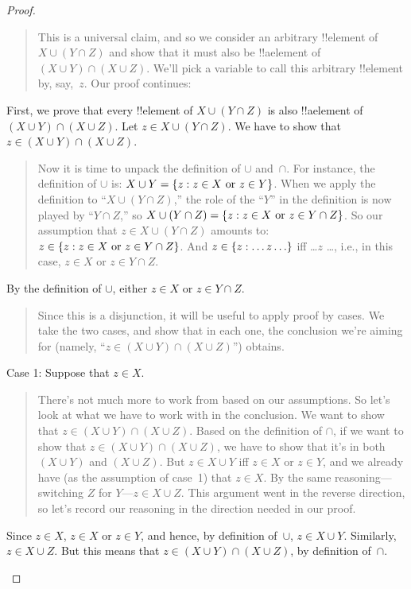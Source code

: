 \documentclass[../../../include/open-logic-section]{subfiles}
\begin{document}
\begin{proof}
\begin{quote}
This is a universal claim, and so we consider an arbitrary !!{element}
of $X \cup (Y \cap Z)$ and show that it must also be !!a{element} of
$(X \cup Y) \cap (X \cup Z)$. We'll pick a variable to call this
arbitrary !!{element} by, say,~$z$.  Our proof continues:
\end{quote}
First, we prove that every !!{element} of $X \cup (Y \cap Z)$ is also
!!a{element} of $(X \cup Y) \cap (X \cup Z)$. Let $z \in X \cup (Y
\cap Z)$. We have to show that $z \in (X \cup Y) \cap (X \cup Z)$.
\begin{quote}  
Now it is time to unpack the definition of $\cup$ and~$\cap$. For
instance, the definition of $\cup$ is: $X \cup Y = \{ z : z \in X
  \text{ or } z \in Y \}$.  When we apply the definition to ``$X \cup (Y
\cap Z)$,'' the role of the ``$Y$'' in the definition is now played by
``$Y \cap Z$,'' so $X \cup (Y \cap Z) = \{ z : z \in X \text{ or }
  z \in Y \cap Z \}$.  So our assumption that $z \in X \cup (Y \cap Z)$
amounts to: $z \in \{ z : z \in X \text{ or } z \in Y \cap
  Z \}$. And $z \in \Setabs{z}{\dots z\dots}$ iff \dots $z$ \dots, i.e.,
in this case, $z \in X$ or $z \in Y \cap Z$.
\end{quote}
By the definition of $\cup$, either $z \in X$ or $z \in Y \cap Z$.
\begin{quote}
Since this is a disjunction, it will be useful to apply proof by
cases. We take the two cases, and show that in each one, the
conclusion we're aiming for (namely, ``$z \in (X \cup Y) \cap (X \cup
Z)$'') obtains.
\end{quote}
Case 1: Suppose that $z \in X$.
\begin{quote}
There's not much more to work from based on our assumptions. So let's
look at what we have to work with in the conclusion. We want to show
that $z \in (X \cup Y) \cap (X \cup Z)$. Based on the definition of
$\cap$, if we want to show that $z \in (X \cup Y) \cap (X \cup Z)$, we
have to show that it's in both $(X \cup Y)$ and $(X \cup Z)$. But $z
\in X \cup Y$ iff $z \in X$ or $z \in Y$, and we already have (as the
assumption of case~1) that $z \in X$. By the same
reasoning---switching $Z$ for $Y$---$z \in X \cup Z$. This argument
went in the reverse direction, so let's record our reasoning in the
direction needed in our proof.
\end{quote}
Since $z \in X$, $z \in X$ or $z \in Y$, and hence, by definition
of~$\cup$, $z \in X \cup Y$. Similarly, $z \in X \cup Z$.  But this
means that $z \in (X \cup Y) \cap (X \cup Z)$, by definition
of~$\cap$.
\begin{quote}

\end{quote}
\end{proof}
\end{document}
